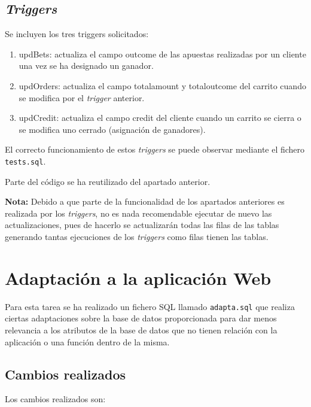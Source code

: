 \documentclass{article}
\begin{document}
\subsection{\textit{Triggers}}
Se incluyen los tres triggers solicitados:
\begin{enumerate}
    \item updBets: actualiza el campo outcome de las apuestas realizadas por un cliente una vez se ha designado un ganador.
    \item updOrders: actualiza el campo totalamount y totaloutcome del carrito cuando se modifica por el \textit{trigger} anterior.
    \item updCredit: actualiza el campo credit del cliente cuando un carrito se cierra o se modifica uno cerrado (asignación de ganadores).
\end{enumerate}

El correcto funcionamiento de estos \textit{triggers} se puede observar mediante el fichero \texttt{tests.sql}.

Parte del código se ha reutilizado del apartado anterior.

\textbf{Nota:} Debido a que parte de la funcionalidad de los apartados anteriores es realizada por los \textit{triggers}, no es nada recomendable ejecutar de nuevo las actualizaciones, pues de hacerlo se actualizarán todas las filas de las tablas generando tantas ejecuciones de los \textit{triggers} como filas tienen las tablas.

\section{Adaptación a la aplicación Web}
Para esta tarea se ha realizado un fichero SQL llamado \texttt{adapta.sql} que realiza ciertas adaptaciones sobre la base de datos proporcionada para dar menos relevancia a los atributos de la base de datos que no tienen relación con la aplicación o una función dentro de la misma.

\subsection{Cambios realizados}
Los cambios realizados son:
\end{document}
